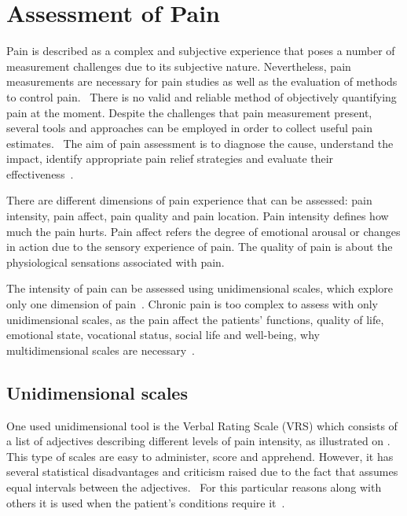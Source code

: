 \section{Assessment of Pain}
Pain is described as a complex and subjective experience that poses a number of measurement challenges due to its subjective nature. Nevertheless, pain measurements are necessary for pain studies as well as the evaluation of methods to control pain.~\cite{Jensen2001} There is no valid and reliable method of objectively quantifying pain at the moment. Despite the challenges that pain measurement present, several tools and approaches can be employed in order to collect useful pain estimates.~\cite{Younger2010} The aim of pain assessment is to diagnose the cause, understand the impact, identify appropriate pain relief strategies and evaluate their effectiveness~\cite{Briggs2010}.

There are different dimensions of pain experience that can be assessed: pain intensity, pain affect, pain quality and pain location. Pain intensity defines how much the pain hurts. %
Pain affect refers the degree of emotional arousal or changes in action due to the sensory experience of pain. The quality of pain is about the physiological sensations associated with pain. 

The intensity of pain can be assessed using unidimensional scales, which explore only one dimension of pain~\cite{Jensen2001}. %
Chronic pain is too complex to assess with only unidimensional scales, as the pain affect the patients' functions, quality of life, emotional state, vocational status, social life and well-being, why multidimensional scales are necessary~\cite{Ebert2010}. 


\subsection{Unidimensional scales}
One used unidimensional tool is the Verbal Rating Scale (VRS) which consists of a list of adjectives describing different levels of pain intensity, as illustrated on . This type of scales are easy to administer, score and apprehend. However, it has several statistical disadvantages and criticism raised due to the fact that assumes equal intervals between the adjectives.~\cite{Jensen2001} For this particular reasons along with others it is used when the patient's conditions require it~\cite{Jensen1986}. 

